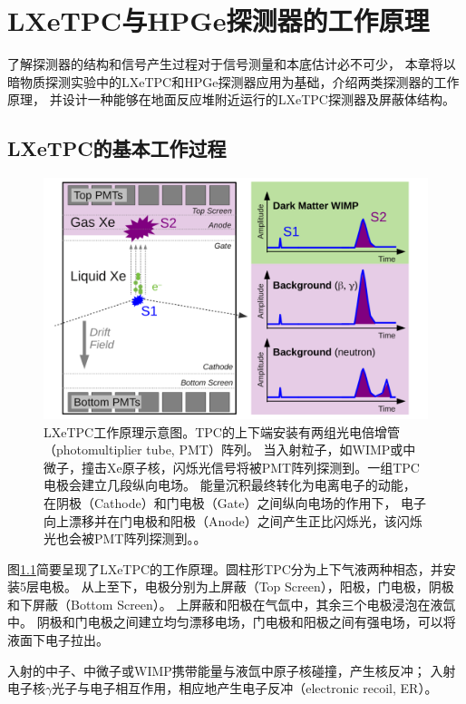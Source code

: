 
\chapter{LXeTPC与HPGe探测器的工作原理}

了解探测器的结构和信号产生过程对于信号测量和本底估计必不可少，
本章将以暗物质探测实验中的LXeTPC和HPGe探测器应用为基础，介绍两类探测器的工作原理，
并设计一种能够在地面反应堆附近运行的LXeTPC探测器及屏蔽体结构。

\section{LXeTPC的基本工作过程}

\begin{figure}
    \centering
    \includegraphics[width=0.7\linewidth]{figures/tpc_signals.png}
    \caption{\label{fig:tpc_principle} LXeTPC工作原理示意图。TPC的上下端安装有两组光电倍增管（photomultiplier tube, PMT）阵列。
    当入射粒子，如WIMP或中微子，撞击$\mathrm{Xe}$原子核，闪烁光信号将被PMT阵列探测到。一组TPC电极会建立几段纵向电场。
    能量沉积最终转化为电离电子的动能，在阴极（Cathode）和门电极（Gate）之间纵向电场的作用下，
    电子向上漂移并在门电极和阳极（Anode）之间产生正比闪烁光，该闪烁光也会被PMT阵列探测到。\cite{xenon_collaboration_xenon1t_2017}。}
\end{figure}

图\ref{fig:tpc_principle}简要呈现了LXeTPC的工作原理。圆柱形TPC分为上下气液两种相态，并安装5层电极。
从上至下，电极分别为上屏蔽（Top Screen），阳极，门电极，阴极和下屏蔽（Bottom Screen）。
上屏蔽和阳极在气氙中，其余三个电极浸泡在液氙中。
阴极和门电极之间建立均匀漂移电场，门电极和阳极之间有强电场，可以将液面下电子拉出。

入射的中子、中微子或WIMP携带能量与液氙中原子核碰撞，产生核反冲；
入射电子核$\gamma$光子与电子相互作用，相应地产生电子反冲（electronic recoil, ER）。

